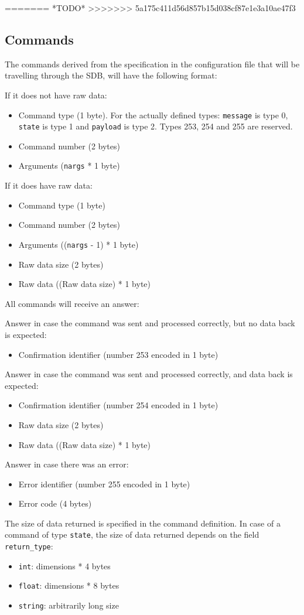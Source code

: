 \documentclass[12pt,a4paper]{report}
\begin{document}
=======
*TODO*
>>>>>>> 5a175c411d56d857b15d038cf87e1e3a10ae47f3

\subsection*{Commands}
The commands derived from the specification in the configuration file that will be travelling through the SDB, will have the following format:

If it does not have raw data:
\begin{itemize}
\item Command type (1 byte). For the actually defined types: \texttt{message} is type 0, \texttt{state} is type 1 and \texttt{payload} is type 2. Types 253, 254 and 255 are reserved.
\item Command number (2 bytes)
\item Arguments (\texttt{nargs} * 1 byte)
\end{itemize}

If it does have raw data:
\begin{itemize}
\item Command type (1 byte)
\item Command number (2 bytes)
\item Arguments ((\texttt{nargs} - 1) * 1 byte)
\item Raw data size (2 bytes)
\item Raw data ((Raw data size) * 1 byte)
\end{itemize}

All commands will receive an answer:

Answer in case the command was sent and processed correctly, but no data back is expected:
\begin{itemize}
\item Confirmation identifier (number 253 encoded in 1 byte)
\end{itemize}

Answer in case the command was sent and processed correctly, and data back is expected:
\begin{itemize}
\item Confirmation identifier (number 254 encoded in 1 byte)
\item Raw data size (2 bytes)
\item Raw data ((Raw data size) * 1 byte)
\end{itemize}

Answer in case there was an error:
\begin{itemize}
\item Error identifier (number 255 encoded in 1 byte)
\item Error code (4 bytes)
\end{itemize}

The size of data returned is specified in the command definition. In case of a command of type \texttt{state}, the size of data returned depends on the field \texttt{return\_type}:
\begin{itemize}
\item \texttt{int}: dimensions * 4 bytes
\item \texttt{float}: dimensions * 8 bytes
\item \texttt{string}: arbitrarily long size
\end{itemize}
\end{document}
